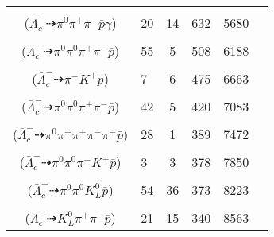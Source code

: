 \documentclass[landscape]{article}
\newcounter{rownumbers}
\newcommand\rn{\stepcounter{rownumbers}\arabic{rownumbers}}
\newcommand{\EOL}{\\} %
\newcommand{\topoTags}[1]{#1} %
\begin{document}
\begin{longtable}{clcccc}
\rn & \makecell[l]{ $ 
\bar{\Lambda}_{c}^{-} \rightarrow \pi^{0} \pi^{-} \bar{\Sigma}^{0} ,
\bar{\Sigma}^{0} \rightarrow \bar{\Lambda} \gamma ,
\bar{\Lambda} \rightarrow \pi^{+} \bar{p} 
$ \\ ($
\bar{\Lambda}_{c}^{-} \dashrightarrow \pi^{0} \pi^{+} \pi^{-} \bar{p} \gamma 
$) } & \topoTags{20 & 14 & }632 & 5680 \EOL

\rn & \makecell[l]{ $ 
\bar{\Lambda}_{c}^{-} \rightarrow \pi^{0} \pi^{0} \pi^{-} \bar{\Lambda} ,
\bar{\Lambda} \rightarrow \pi^{+} \bar{p} 
$ \\ ($
\bar{\Lambda}_{c}^{-} \dashrightarrow \pi^{0} \pi^{0} \pi^{+} \pi^{-} \bar{p} 
$) } & \topoTags{55 & 5 & }508 & 6188 \EOL

\rn & \makecell[l]{ $ 
\bar{\Lambda}_{c}^{-} \rightarrow \pi^{-} K^{+} \bar{p} 
$ \\ ($
\bar{\Lambda}_{c}^{-} \dashrightarrow \pi^{-} K^{+} \bar{p} 
$) } & \topoTags{7 & 6 & }475 & 6663 \EOL

\rn & \makecell[l]{ $ 
\bar{\Lambda}_{c}^{-} \rightarrow \pi^{+} \pi^{-} K^{0} \bar{p} ,
K^{0} \rightarrow K_{S}^{0} ,
K_{S}^{0} \rightarrow \pi^{0} \pi^{0} 
$ \\ ($
\bar{\Lambda}_{c}^{-} \dashrightarrow \pi^{0} \pi^{0} \pi^{+} \pi^{-} \bar{p} 
$) } & \topoTags{42 & 5 & }420 & 7083 \EOL

\rn & \makecell[l]{ $ 
\bar{\Lambda}_{c}^{-} \rightarrow \pi^{-} \omega \bar{\Lambda} ,
\omega \rightarrow \pi^{0} \pi^{+} \pi^{-} ,
\bar{\Lambda} \rightarrow \pi^{+} \bar{p} 
$ \\ ($
\bar{\Lambda}_{c}^{-} \dashrightarrow \pi^{0} \pi^{+} \pi^{+} \pi^{-} \pi^{-} \bar{p} 
$) } & \topoTags{28 & 1 & }389 & 7472 \EOL

\rn & \makecell[l]{ $ 
\bar{\Lambda}_{c}^{-} \rightarrow \pi^{0} \pi^{0} \pi^{-} K^{+} \bar{p} 
$ \\ ($
\bar{\Lambda}_{c}^{-} \dashrightarrow \pi^{0} \pi^{0} \pi^{-} K^{+} \bar{p} 
$) } & \topoTags{3 & 3 & }378 & 7850 \EOL

\rn & \makecell[l]{ $ 
\bar{\Lambda}_{c}^{-} \rightarrow \pi^{0} \pi^{0} K^{0} \bar{p} ,
K^{0} \rightarrow K_{L}^{0} 
$ \\ ($
\bar{\Lambda}_{c}^{-} \dashrightarrow \pi^{0} \pi^{0} K_{L}^{0} \bar{p} 
$) } & \topoTags{54 & 36 & }373 & 8223 \EOL

\rn & \makecell[l]{ $ 
\bar{\Lambda}_{c}^{-} \rightarrow \pi^{+} \pi^{-} K^{0} \bar{p} ,
K^{0} \rightarrow K_{L}^{0} 
$ \\ ($
\bar{\Lambda}_{c}^{-} \dashrightarrow K_{L}^{0} \pi^{+} \pi^{-} \bar{p} 
$) } & \topoTags{21 & 15 & }340 & 8563 \EOL


\end{longtable}
\end{document}
